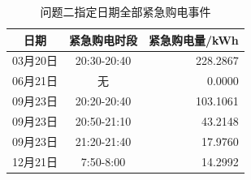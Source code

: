 \begin{table}[htbp]\centering
\caption{问题二指定日期全部紧急购电事件}\label{tab:q2emerg}
\small
\begin{tabular}{ccr}
\toprule
日期 & 紧急购电时段 & 紧急购电量/kWh \\
\midrule
03月20日 & 20:30-20:40 & 228.2867 \\
06月21日 & 无 & 0.0000 \\
09月23日 & 20:20-20:40 & 103.1061 \\
09月23日 & 20:50-21:10 & 43.2148 \\
09月23日 & 21:20-21:40 & 17.9760 \\
12月21日 & 7:50-8:00 & 14.2992 \\
\bottomrule
\end{tabular}
\end{table}
